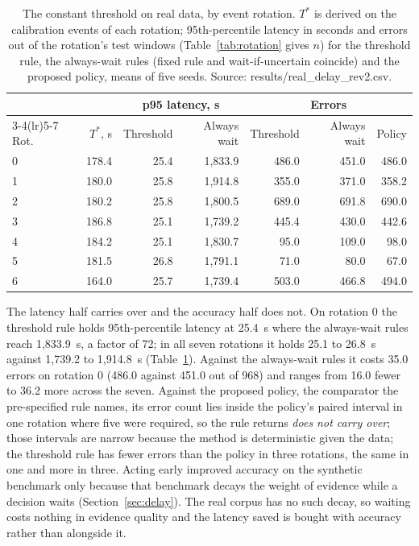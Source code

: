 \documentclass[conference,a4paper]{IEEEtran}
\newif\ifsubmission
\newcommand{\masteronly}[1]{\ifsubmission\else#1\fi}
\begin{document}
\masteronly{%
\begin{table}[t]
\caption{The constant threshold on real data, by event rotation. $T^\ast$ is derived on the calibration events of each rotation; 95th-percentile latency in seconds and errors out of the rotation's test windows (Table~\ref{tab:rotation} gives $n$) for the threshold rule, the always-wait rules (fixed rule and wait-if-uncertain coincide) and the proposed policy, means of five seeds. Source: results/real\_delay\_rev2.csv.}
\label{tab:realthr}
\centering\scriptsize\setlength{\tabcolsep}{3.5pt}
\begin{tabular}{@{}lrrrrrr@{}}
\toprule
& & \multicolumn{2}{c}{p95 latency, s} & \multicolumn{3}{c}{Errors} \\
\cmidrule(lr){3-4}\cmidrule(lr){5-7}
Rot. & $T^\ast$, s & Threshold & Always wait & Threshold & Always wait & Policy \\
\midrule
0 & 178.4 & 25.4 & 1,833.9 & 486.0 & 451.0 & 486.0 \\
1 & 180.0 & 25.8 & 1,914.8 & 355.0 & 371.0 & 358.2 \\
2 & 180.2 & 25.8 & 1,800.5 & 689.0 & 691.8 & 690.0 \\
3 & 186.8 & 25.1 & 1,739.2 & 445.4 & 430.0 & 442.6 \\
4 & 184.2 & 25.1 & 1,830.7 & 95.0 & 109.0 & 98.0 \\
5 & 181.5 & 26.8 & 1,791.1 & 71.0 & 80.0 & 67.0 \\
6 & 164.0 & 25.7 & 1,739.4 & 503.0 & 466.8 & 494.0 \\
\bottomrule
\end{tabular}
\end{table}}%

The latency half carries over and the accuracy half does not. On rotation 0 the threshold rule holds 95th-percentile latency at 25.4~s where the always-wait rules reach 1,833.9~s, a factor of 72; in all seven rotations it holds 25.1 to 26.8~s against 1,739.2 to 1,914.8~s\masteronly{ (Table~\ref{tab:realthr})}. Against the always-wait rules it costs 35.0 errors on rotation 0 (486.0 against 451.0 out of 968) and ranges from 16.0 fewer to 36.2 more across the seven. Against the proposed policy, the comparator the pre-specified rule names, its error count lies inside the policy's paired interval in one rotation where five were required, so the rule returns \emph{does not carry over}; those intervals are narrow because the method is deterministic given the data; the threshold rule has fewer errors than the policy in three rotations, the same in one and more in three. Acting early improved accuracy on the synthetic benchmark only because that benchmark decays the weight of evidence while a decision waits (Section~\ref{sec:delay}). The real corpus has no such decay, so waiting costs nothing in evidence quality and the latency saved is bought with accuracy rather than alongside it.
\end{document}
